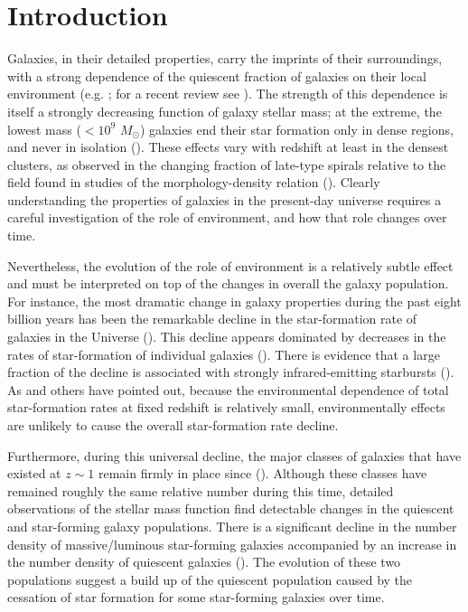 \documentclass{emulateapj}
\begin{document}
\section{Introduction}
Galaxies, in their detailed properties, carry the imprints of their surroundings, with a strong dependence of the quiescent fraction of galaxies on their local environment (e.g. \citealt{hubble36a, oemler74a, dressler80a, hermit96a, guzzo97a}; for a recent review see \citealt{blanton09a}).  The strength of this dependence is itself a strongly decreasing function of galaxy stellar mass; at the extreme, the lowest mass ($<10^{9}$ $M_\odot$) galaxies end their star formation only in dense regions, and never in isolation (\citealt{geha12a}). These effects vary with redshift at least in the densest clusters, as observed in the changing fraction of late-type spirals relative to the field found in studies of the morphology-density relation (\citealt{dressler84a, Fasano:2000aa, Smith:2005aa, desai07a}). Clearly understanding the properties of galaxies in the present-day universe requires a careful investigation of the role of environment, and how that role changes over time.


Nevertheless, the evolution of the role of environment is a relatively subtle effect and must be interpreted on top of the changes in overall the galaxy population. For instance, the most dramatic change in galaxy properties during the past eight billion years has been the remarkable decline in the star-formation rate of galaxies in the Universe (\citealt{hopkins06a}). This decline appears dominated by decreases in the rates of star-formation of individual galaxies (\citealt{Noeske:2007aa}). There is evidence that a large fraction of the decline is associated with strongly infrared-emitting starbursts (\citealt{bell05a, magnelli09a}). As \cite{cooper08a} and others have pointed out, because the environmental dependence of total star-formation rates at fixed redshift is relatively small, environmentally effects are unlikely to cause the overall star-formation rate decline.

Furthermore, during this universal decline, the major classes of galaxies that have existed at $z \sim 1$ remain firmly in place since (\citealt{bundy06a, borch06a, taylor09a, Moustakas:2013aa}). Although these classes have remained roughly the same relative number during this time, detailed observations of the stellar mass function find detectable changes in the quiescent and star-forming galaxy populations. There is a significant decline in the number density of massive/luminous star-forming galaxies accompanied by an increase in the number density of quiescent galaxies (\citealt{Bell:2004aa, Blanton:2006aa, bundy06a,  borch06a, Moustakas:2013aa}). The evolution of these two populations suggest a build up of the quiescent population caused by the cessation of star formation for some star-forming galaxies over time.
\end{document}
